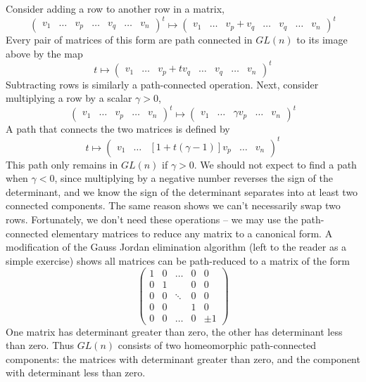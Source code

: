 \begin{example}
    Consider adding a row to another row in a matrix,
    \[ \begin{pmatrix} v_1 & \dots & v_p & \dots & v_q & \dots & v_n \end{pmatrix}^t \mapsto \begin{pmatrix} v_1 & \dots & v_p + v_q & \dots & v_q & \dots & v_n \end{pmatrix}^t \]
    Every pair of matrices of this form are path connected in $GL(n)$ to its image above by the map
    \[ t \mapsto \begin{pmatrix} v_1 & \dots & v_p + t v_q & \dots & v_q & \dots & v_n \end{pmatrix}^t \]
    Subtracting rows is similarly a path-connected operation. Next, consider multiplying a row by a scalar $\gamma > 0$,
    \[ \begin{pmatrix} v_1 & \dots & v_p & \dots & v_n \end{pmatrix}^t \mapsto \begin{pmatrix} v_1 & \dots & \gamma v_p & \dots & v_n \end{pmatrix}^t \]
    A path that connects the two matrices is defined by
    \[ t \mapsto \begin{pmatrix} v_1 & \dots & [1 + t(\gamma - 1)]v_p & \dots & v_n \end{pmatrix}^t \]
    This path only remains in $GL(n)$ if $\gamma > 0$. We should not expect to find a path when $\gamma < 0$, since multiplying by a negative number reverses the sign of the determinant, and we know the sign of the determinant separates into at least two connected components. The same reason shows we can't necessarily swap two rows. Fortunately, we don't need these operations -- we may use the path-connected elementary matrices to reduce any matrix to a canonical form. A modification of the Gauss Jordan elimination algorithm (left to the reader as a simple exercise) shows all matrices can be path-reduced to a matrix of the form
    \[ \begin{pmatrix} 1 & 0 & \dots & 0 & 0 \\ 0 & 1 & & 0 & 0 \\ 0 & 0 & \ddots & 0 & 0 \\ 0 & 0 &  & 1 & 0 \\ 0 & 0 & \dots & 0 & \pm 1 \end{pmatrix} \]
    One matrix has determinant greater than zero, the other has determinant less than zero. Thus $GL(n)$ consists of two homeomorphic path-connected components: the matrices with determinant greater than zero, and the component with determinant less than zero.
\end{example}

